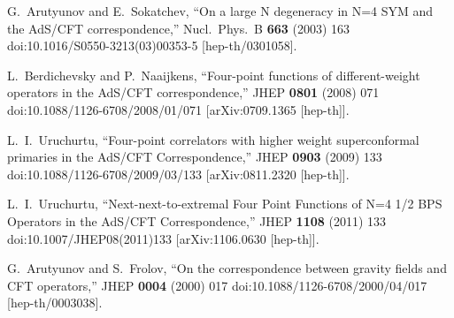 \documentclass[12pt,a4paper]{article}
\numberwithin{equation}{section}
\begin{document}
\begin{thebibliography}{}
   
  G.~Arutyunov and E.~Sokatchev,
  ``On a large N degeneracy in N=4 SYM and the AdS/CFT correspondence,''
  Nucl.\ Phys.\ B {\bf 663} (2003) 163
  doi:10.1016/S0550-3213(03)00353-5
  [hep-th/0301058].
  
  L.~Berdichevsky and P.~Naaijkens,
  ``Four-point functions of different-weight operators in the AdS/CFT correspondence,''
  JHEP {\bf 0801} (2008) 071
  doi:10.1088/1126-6708/2008/01/071
  [arXiv:0709.1365 [hep-th]].

  L.~I.~Uruchurtu,
  ``Four-point correlators with higher weight superconformal primaries in the AdS/CFT Correspondence,''
  JHEP {\bf 0903} (2009) 133
  doi:10.1088/1126-6708/2009/03/133
  [arXiv:0811.2320 [hep-th]].

  L.~I.~Uruchurtu,
  ``Next-next-to-extremal Four Point Functions of N=4 1/2 BPS Operators in the AdS/CFT Correspondence,''
  JHEP {\bf 1108} (2011) 133
  doi:10.1007/JHEP08(2011)133
  [arXiv:1106.0630 [hep-th]].


  G.~Arutyunov and S.~Frolov,
  ``On the correspondence between gravity fields and CFT operators,''
  JHEP {\bf 0004} (2000) 017
  doi:10.1088/1126-6708/2000/04/017
  [hep-th/0003038].
  
   

\end{thebibliography}
\end{document}
